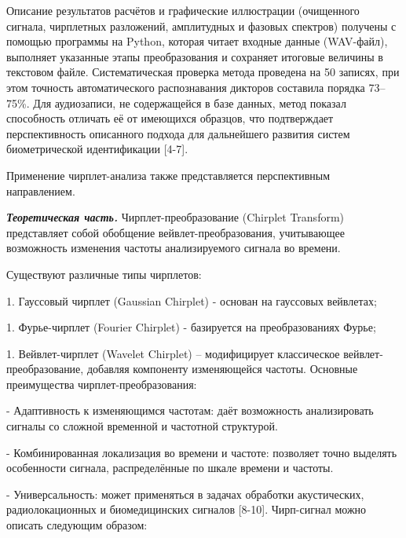 \begin{multicols}{2}
Описание результатов расчётов и графические иллюстрации (очищенного
сигнала, чирплетных разложений, амплитудных и фазовых спектров) получены
с помощью программы на Python, которая читает входные данные (WAV-файл),
выполняет указанные этапы преобразования и сохраняет итоговые величины в
текстовом файле. Систематическая проверка метода проведена на 50
записях, при этом точность автоматического распознавания дикторов
составила порядка 73--75\%. Для аудиозаписи, не содержащейся в базе
данных, метод показал способность отличать её от имеющихся образцов, что
подтверждает перспективность описанного подхода для дальнейшего развития
систем биометрической идентификации {[}4-7{]}.

Применение чирплет-анализа также представляется перспективным
направлением.

\emph{{\bfseries Теоретическая часть.}} Чирплет-преобразование (Chirplet
Transform) представляет собой обобщение вейвлет-преобразования,
учитывающее возможность изменения частоты анализируемого сигнала во
времени.

Существуют различные типы чирплетов:


1. Гауссовый чирплет (Gaussian Chirplet) - основан на гауссовых
вейвлетах;

1. Фурье-чирплет (Fourier Chirplet) - базируется на преобразованиях
Фурье;

1. Вейвлет-чирплет (Wavelet Chirplet) -- модифицирует классическое
вейвлет-преобразование, добавляя компоненту изменяющейся частоты.
Основные преимущества чирплет-преобразования:


- Адаптивность к изменяющимся частотам: даёт возможность анализировать
сигналы со сложной временной и частотной структурой.

- Комбинированная локализация во времени и частоте: позволяет точно
выделять особенности сигнала, распределённые по шкале времени и
частоты.

- Универсальность: может применяться в задачах обработки акустических,
радиолокационных и биомедицинских сигналов {[}8-10{]}.
Чирп-сигнал можно описать следующим образом:
\end{multicols}


